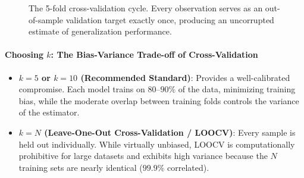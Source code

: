 \begin{figure}[htbp]
\centering
{}
\caption{The 5-fold cross-validation cycle. Every observation serves as an out-of-sample validation target exactly once, producing an uncorrupted estimate of generalization performance.}\label{fig:k_fold_cv}
\end{figure}

\paragraph{Choosing $k$: The Bias-Variance Trade-off of Cross-Validation}
\begin{itemize}
    \item \textbf{$k = 5$ or $k = 10$ (Recommended Standard)}: Provides a well-calibrated compromise. Each model trains on $80\text{--}90\%$ of the data, minimizing training bias, while the moderate overlap between training folds controls the variance of the estimator.
    \item \textbf{$k = N$ (Leave-One-Out Cross-Validation / LOOCV)}: Every sample is held out individually. While virtually unbiased, LOOCV is computationally prohibitive for large datasets and exhibits high variance because the $N$ training sets are nearly identical ($99.9\%$ correlated).
\end{itemize}


